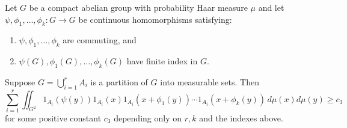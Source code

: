 \begin{theorem} \label{th:counting-partition}
Let $G$ be a compact abelian group with  probability Haar measure $\mu$ and let $\psi, \phi_1, \ldots, \phi_k: G \to G$ be continuous homomorphisms satisfying:
\begin{enumerate}[label=(\alph*), leftmargin=*]
\item $\psi, \phi_1, \ldots, \phi_k$ are commuting, and
\item $\psi(G), \phi_1(G), \ldots, \phi_k(G)$ have finite index in $G$.
\end{enumerate}
Suppose $G = \bigcup_{i=1}^r A_i$ is a partition of $G$ into measurable sets. Then 
\begin{equation} \label{eq:counting-brauer}
\sum_{i=1}^r \iint_{G^2} 1_{A_i}(\psi(y)) 1_{A_i}(x) 1_{A_i}(x + \phi_1(y)) \cdots 1_{A_i}(x + \phi_k(y)) \, d \mu(x) d\mu(y) \geq c_3
\end{equation} 
for some positive constant $c_3$ depending only on $r, k$ and the indexes above.
\end{theorem}
